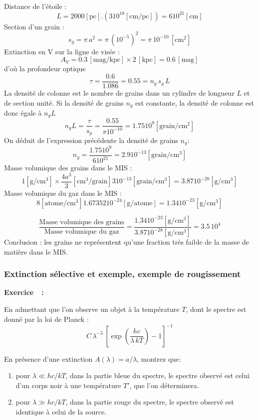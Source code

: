\documentclass[a4paper,10pt]{report}
\newcounter{noexo}
\newenvironment{Exercise}[1][]{%
  \stepcounter{noexo}
  \medskip\noindent\textbf{Exercice~\thenoexo~:~#1}
  \medskip\par
  \addcontentsline{toc}{subsubsection}{Exercice~\thenoexo~:~#1}
}{}
\begin{document}
\begin{Answer}
  Distance de l'étoile :
  $$
  L = 2000[\mathrm{pc}] .(3 10^{18} [\mathrm{cm/pc}]) = 6 10^{21} [\mathrm{cm}]
  $$
  Section d'un grain :
  $$
  s_g = \pi\,a^2 = \pi\,(10^{-5})^2 = \pi\,10^{-10}\, [\mathrm{cm^{2}}]
  $$
  Extinction en V sur la ligne de visée :
  $$
  A_V = 0.3\,[\mathrm{mag/kpc}]\times 2\,[\mathrm{kpc}] = 0.6\,[\mathrm{mag}]
  $$
  d'où la profondeur optique
  $$
  \tau = \frac{0.6}{1.086} = 0.55 = n_g\,s_g\,L
  $$
  La densité de colonne est le nombre de grains dans un cylindre de
  longueur $L$ et de section unité. Si la densité de grains $n_g$ est
  constante, la densité de colonne est donc égale à $n_g L$
  $$
  n_g L = \frac{\tau}{s_g} = \frac{0.55}{\pi 10^{-10}} = 1.75 10^9
  [\mathrm{grain/cm^2}]
  $$
  On déduit de l'expression précédente la densité de grains $n_g$:
  $$
  n_g = \frac{1.75 10^{9}}{6 10^{21}} = 2.9 10^{-13} [\mathrm{grain/cm^{3}}]
  $$
  Masse volumique des grains dans le MIS :
  $$
  1 [\mathrm{g/cm^{3}}]\times \frac{4a^{3}}{3} [\mathrm{cm^3/grain}] 3
  10^{-13} [\mathrm{grain/cm^3}]= 3.87 10^{-28} [\mathrm{g/cm^3}]
  $$
  Masse volumique du gaz dans le MIS :
  $$
  8 [\mathrm{atome/cm^3}] 1.67352 10^{-24} [\mathrm{g/atome}] = 1.34
  10^{-23}[\mathrm{g/cm^3}]
  $$

  $$
  \frac{\text{Masse volumique des grains}}{\text{Masse volumique du
      gaz}} = \frac{1.34 10^{-23} [\mathrm{g/cm^3}]}{3.87
    10^{-28}[\mathrm{g/cm^3}]} = 3.5\,10^4
  $$
  Conclusion : les grains ne représentent qu'une fraction très faible de
  la masse de matière dans le MIS.
\end{Answer}

\subsubsection{Extinction sélective et exemple, exemple de rougissement}

\begin{Exercise}
  En admettant que l'on observe un objet à la température $T$, dont le
  spectre est donné par la loi de Planck :
  $$
  C\,\lambda^{-5}\,\left[\exp\left({\frac{hc}{\lambda\,kT}}\right)-1\right]^{-1}
  $$

  En présence d'une extinction $A(\lambda) = a/\lambda$, montrez que:
  \begin{enumerate}
  \item pour $\lambda \ll hc/kT$, dans la partie bleue du spectre, le
    spectre observé est celui d'un corps noir à une température $T'$,
    que l'on déterminera.
  \item pour $\lambda \gg hc/kT$, dans la partie rouge du spectre, le
    spectre observé est identique à celui de la source.
  \end{enumerate}
\end{Exercise}
\end{document}

